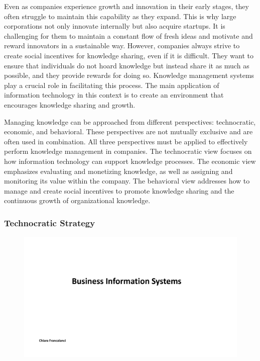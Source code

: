 Even as companies experience growth and innovation in their early
stages, they often struggle to maintain this capability as they expand.
This is why large corporations not only innovate internally but also
acquire startups. It is challenging for them to maintain a constant flow
of fresh ideas and motivate and reward innovators in a sustainable way.
However, companies always strive to create social incentives for
knowledge sharing, even if it is difficult. They want to ensure that
individuals do not hoard knowledge but instead share it as much as
possible, and they provide rewards for doing so. Knowledge management
systems play a crucial role in facilitating this process. The main
application of information technology in this context is to create an
environment that encourages knowledge sharing and growth.

Managing knowledge can be approached from different perspectives:
technocratic, economic, and behavioral. These perspectives are not
mutually exclusive and are often used in combination. All three
perspectives must be applied to effectively perform knowledge management
in companies. The technocratic view focuses on how information
technology can support knowledge processes. The economic view emphasizes
evaluating and monetizing knowledge, as well as assigning and monitoring
its value within the company. The behavioral view addresses how to
manage and create social incentives to promote knowledge sharing and the
continuous growth of organizational knowledge.

\subsubsection{Technocratic Strategy}\label{technocratic-strategy}

\begin{figure}[!h]
  \centering
  \includegraphics[page=10, trim = 1.5cm 6.5cm 1.5cm 3.5cm, clip, width=\imagewidth]{images/05 - KM.pdf}
\end{figure}

